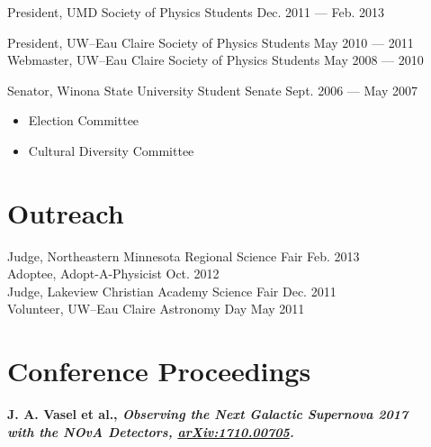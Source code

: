 \documentclass[11pt]{cv}
\begin{document}
\begin{cv}
President, UMD Society of Physics Students \hfill Dec. 2011 --- Feb. 2013

President, UW--Eau Claire Society of Physics Students \hfill May 2010 --- 2011 \\
Webmaster, UW--Eau Claire Society of Physics Students \hfill May 2008 --- 2010

Senator, Winona State University Student Senate \hfill Sept. 2006 --- May 2007
\begin{itemize}
  \item Election Committee
  \item Cultural Diversity Committee
\end{itemize}


\section{Outreach}
Judge, Northeastern Minnesota Regional Science Fair \hfill Feb. 2013 \\
Adoptee, Adopt-A-Physicist \hfill Oct. 2012 \\
Judge, Lakeview Christian Academy Science Fair \hfill Dec. 2011 \\
Volunteer, UW--Eau Claire Astronomy Day \hfill May 2011


\section{Conference Proceedings}
\begin{etaremune}
  \item \bf J. A. Vasel \rm et al., \it Observing the Next Galactic Supernova \rm \hfill 2017 \\
  \it with the NOvA Detectors, \rm \href{http://arxiv.org/abs/arXiv:1710.00705}{arXiv:1710.00705}.
\end{etaremune}



\end{cv}
\end{document}
